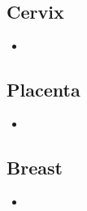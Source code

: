 \subsection{Cervix}
\begin{center}
\end{center}
\begin{multicols}{2}
\begin{itemize}
  \item 
\end{itemize}
\end{multicols}

\subsection{Placenta}
\begin{center}
\end{center}
\begin{multicols}{2}
\begin{itemize}
  \item 
\end{itemize}
\end{multicols}

\subsection{Breast}
\begin{center}
\end{center}
\begin{multicols}{2}
\begin{itemize}
  \item 
\end{itemize}
\end{multicols}

